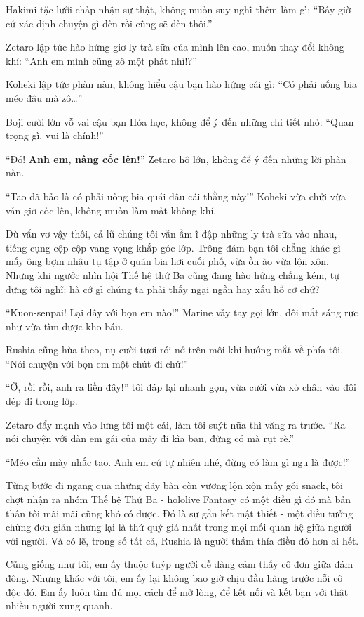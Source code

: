 \documentclass[../main.tex]{subfiles}
\begin{document}
Hakimi tặc lưỡi chấp nhận sự thật, không muốn suy nghĩ thêm làm gì: ``Bây giờ cứ xác định chuyện gì đến rồi cũng sẽ đến thôi.''

Zetaro lập tức hào hứng giơ ly trà sữa của mình lên cao, muốn thay đổi không khí: ``Anh em mình cũng zô một phát nhỉ!?''

Koheki lập tức phàn nàn, không hiểu cậu bạn hào hứng cái gì: ``Có phải uống bia méo đâu mà zô\dots''

Boji cười lớn vỗ vai cậu bạn Hóa học, không để ý đến những chi tiết nhỏ: ``Quan trọng gì, vui là chính!''

``Đó! \textbf{Anh em, nâng cốc lên!}'' Zetaro hô lớn, không để ý đến những lời phàn nàn.

``Tao đã bảo là có phải uống bia quái đâu cái thằng này!'' Koheki vừa chửi vừa vẫn giơ cốc lên, không muốn làm mất không khí.

Dù vẩn vơ vậy thôi, cả lũ chúng tôi vẫn ầm ĩ đập những ly trà sữa vào nhau, tiếng cụng cộp cộp vang vọng khắp góc lớp. Trông đám bạn tôi chẳng khác gì mấy ông bợm nhậu tụ tập ở quán bia hơi cuối phố, vừa ồn ào vừa lộn xộn. Nhưng khi ngước nhìn hội Thế hệ thứ Ba cũng đang hào hứng chẳng kém, tự dưng tôi nghĩ: hà cớ gì chúng ta phải thấy ngại ngần hay xấu hổ cơ chứ?

``Kuon-senpai! Lại đây với bọn em nào!'' Marine vẫy tay gọi lớn, đôi mắt sáng rực như vừa tìm được kho báu.

Rushia cũng hùa theo, nụ cười tươi rói nở trên môi khi hướng mắt về phía tôi. ``Nói chuyện với bọn em một chút đi chứ!''

``Ờ, rồi rồi, anh ra liền đây!'' tôi đáp lại nhanh gọn, vừa cười vừa xỏ chân vào đôi dép đi trong lớp.

Zetaro đẩy mạnh vào lưng tôi một cái, làm tôi suýt nữa thì văng ra trước. ``Ra nói chuyện với dàn em gái của mày đi kìa bạn, đừng có mà rụt rè.''

``Méo cần mày nhắc tao. Anh em cứ tự nhiên nhé, đừng có làm gì ngu là được!''

Từng bước đi ngang qua những dãy bàn còn vương lộn xộn mấy gói snack, tôi chợt nhận ra nhóm Thế hệ Thứ Ba - hololive Fantasy có một điều gì đó mà bản thân tôi mãi mãi cũng khó có được. Đó là sự gắn kết mật thiết - một điều tưởng chừng đơn giản nhưng lại là thứ quý giá nhất trong mọi mối quan hệ giữa người với người. Và có lẽ, trong số tất cả, Rushia là người thấm thía điều đó hơn ai hết.

Cũng giống như tôi, em ấy thuộc tuýp người dễ dàng cảm thấy cô đơn giữa đám đông. Nhưng khác với tôi, em ấy lại không bao giờ chịu đầu hàng trước nỗi cô độc đó. Em ấy luôn tìm đủ mọi cách để mở lòng, để kết nối và kết bạn với thật nhiều người xung quanh.
\end{document}
